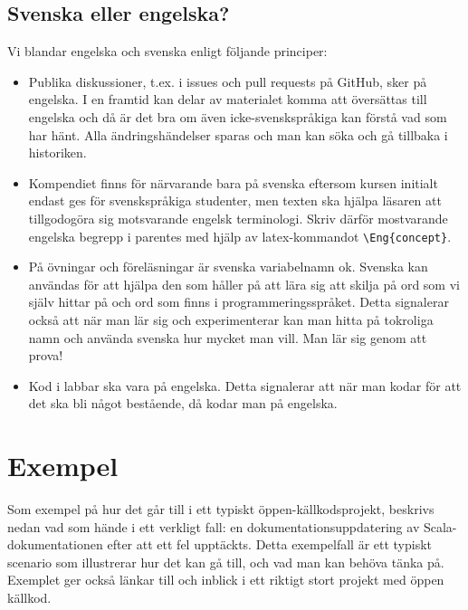 \subsection{Svenska eller engelska?}

Vi blandar engelska och svenska enligt följande principer:

\begin{itemize}

\item Publika diskussioner, t.ex. i issues och pull requests på GitHub, sker på engelska. I en framtid kan delar av materialet komma att översättas till engelska och då är det bra om även icke-svenskspråkiga kan förstå vad som har hänt. Alla ändringshändelser sparas och man kan söka och gå tillbaka i historiken.

\item Kompendiet finns för närvarande bara på svenska eftersom kursen initialt endast ges för svenskspråkiga studenter, men texten ska hjälpa läsaren att tillgodogöra sig motsvarande engelsk terminologi. Skriv därför mostvarande engelska begrepp  i parentes med hjälp av latex-kommandot \verb+\Eng{concept}+.

\item På övningar och föreläsningar är svenska variabelnamn ok. Svenska kan användas för att hjälpa den som håller på att lära sig att skilja på ord som vi själv hittar på och ord som finns i programmeringsspråket. Detta signalerar också att när man lär sig och experimenterar kan man hitta på tokroliga namn och använda svenska hur mycket man vill. Man lär sig genom att prova!

\item Kod i labbar ska vara på engelska. Detta signalerar att när man kodar för att det ska bli något bestående, då kodar man på engelska.

\end{itemize}

\section{Exempel}\label{section:OSS-contribution-example}

Som exempel på hur det går till i ett typiskt öppen-källkodsprojekt, beskrivs nedan vad som hände i ett verkligt fall: en dokumentationsuppdatering av Scala-dokumentationen efter att ett fel upptäckts. Detta exempelfall är ett typiskt scenario som illustrerar hur det kan gå till, och vad man kan behöva tänka på. Exemplet ger också länkar till och inblick i ett riktigt stort projekt med öppen källkod.

